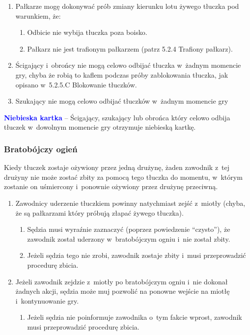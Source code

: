 \documentclass[12pt]{article}
\newcommand\bluecard[1]{\bgroup\textcolor{blue}{\textbf{#1}}}
\begin{document}
\begin{enumerate}
	\item
	      Pałkarze mogę dokonywać prób zmiany kierunku lotu żywego tłuczka pod
	      warunkiem, że:

	      \begin{enumerate}
		      \item
		            Odbicie nie wybija tłuczka poza boisko.
		      \item
		            Pałkarz nie jest trafionym pałkarzem (patrz 5.2.4 Trafiony pałkarz).
	      \end{enumerate}
	\item
	      Ścigający i~obrońcy nie mogą celowo odbijać tłuczka w~żadnym momencie
	      gry, chyba że robią to kaflem podczas próby zablokowania tłuczka, jak
	      opisano w~5.2.5.C Blokowanie tłuczków.
	\item
	      Szukający nie mogą celowo odbijać tłuczków w~żadnym momencie gry
\end{enumerate}

\bluecard{Niebieska kartka} -- Ścigający, szukający lub obrońca który celowo
odbija tłuczek w~dowolnym momencie gry otrzymuje niebieską kartkę.

\subsubsection{Bratobójczy ogień}

Kiedy tłuczek zostaje ożywiony przez jedną drużynę, żaden zawodnik z~tej
drużyny nie może zostać zbity za pomocą tego tłuczka do momentu, w~którym zostanie on uśmiercony i~ponownie ożywiony przez drużynę
przeciwną.

\begin{enumerate}
	\item
	      Zawodnicy uderzenie tłuczkiem powinny natychmiast zejść z~miotły
	      (chyba, że są pałkarzami który próbują złapać żywego tłuczka).

	      \begin{enumerate}
		      \item
		            Sędzia musi wyraźnie zaznaczyć (poprzez powiedzenie ``czysto''), że
		            zawodnik został uderzony w~bratobójczym ogniu i~nie został zbity.
		      \item
		            Jeżeli sędzia tego nie zrobi, zawodnik zostaje zbity i~musi
		            przeprowadzić procedurę zbicia.
	      \end{enumerate}
	\item
	      Jeżeli zawodnik zejdzie z~miotły po bratobójczym ogniu i~nie dokonał
	      żadnych akcji, sędzia może muj pozwolić na ponowne wejście na miotłę i~kontynuowanie gry.

	      \begin{enumerate}
		      \item
		            Jeżeli sędzia nie poinformuje zawodnika o~tym fakcie wprost,
		            zawodnik musi przeprowadzić procedurę zbicia.
	      \end{enumerate}
\end{enumerate}
\end{document}
